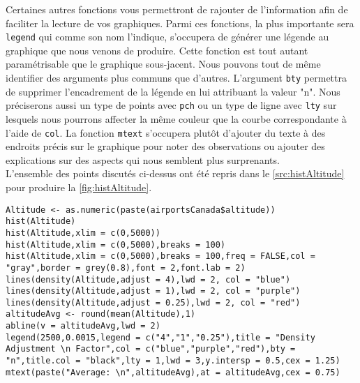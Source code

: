 Certaines autres fonctions vous permettront de rajouter de l'information afin de faciliter la lecture de vos graphiques. Parmi ces fonctions, la plus importante sera \texttt{legend} qui comme son nom l'indique, s'occupera de générer une légende au graphique que nous venons de produire. Cette fonction est tout autant paramétrisable que le graphique sous-jacent. Nous pouvons tout de même identifier des arguments plus communs que d'autres. L'argument \texttt{bty} permettra de supprimer l'encadrement de la légende en lui attribuant la valeur "n". Nous préciserons aussi un type de points avec \texttt{pch} ou un type de ligne avec \texttt{lty} sur lesquels nous pourrons affecter la même couleur que la courbe correspondante à l'aide de \texttt{col}. La fonction \texttt{mtext} s'occupera plutôt d'ajouter du texte à des endroits précis sur le graphique pour noter des observations ou ajouter des explications sur des aspects qui nous semblent plus surprenants. \\

L'ensemble des points discutés ci-dessus ont été repris dans le \autoref{src:histAltitude} pour produire la \autoref{fig:histAltitude}. \\

\begin{lstlisting}[caption = {\texttt{hist}, \texttt{density}, \texttt{lines}, \texttt{abline}, \texttt{legend} et \texttt{mtext}},label=src:histAltitude]
Altitude <- as.numeric(paste(airportsCanada$altitude))
hist(Altitude)
hist(Altitude,xlim = c(0,5000))
hist(Altitude,xlim = c(0,5000),breaks = 100)
hist(Altitude,xlim = c(0,5000),breaks = 100,freq = FALSE,col = "gray",border = grey(0.8),font = 2,font.lab = 2)
lines(density(Altitude,adjust = 4),lwd = 2, col = "blue")
lines(density(Altitude,adjust = 1),lwd = 2, col = "purple")
lines(density(Altitude,adjust = 0.25),lwd = 2, col = "red")
altitudeAvg <- round(mean(Altitude),1)
abline(v = altitudeAvg,lwd = 2)
legend(2500,0.0015,legend = c("4","1","0.25"),title = "Density Adjustment \n Factor",col = c("blue","purple","red"),bty = "n",title.col = "black",lty = 1,lwd = 3,y.intersp = 0.5,cex = 1.25)
mtext(paste("Average: \n",altitudeAvg),at = altitudeAvg,cex = 0.75)
\end{lstlisting}


